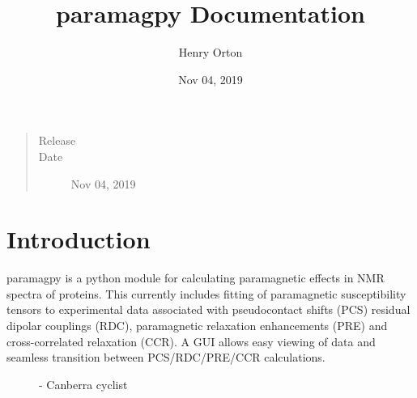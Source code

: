 \documentclass[a4paper,10pt,english,openany,oneside]{sphinxmanual}
\title{paramagpy Documentation}
\date{Nov 04, 2019}
\author{Henry Orton}
\begin{document}
\pagestyle{empty}
\maketitle
\pagestyle{plain}
\sphinxtableofcontents
\pagestyle{normal}
\label{\detokenize{index::doc}}

\begin{quote}\begin{description}
\item[{Release}] 

\item[{Date}] \leavevmode
Nov 04, 2019

\end{description}\end{quote}


\chapter{Introduction}
\label{\detokenize{index:introduction}}
paramagpy is a python module for calculating paramagnetic effects in NMR spectra of proteins. This currently includes fitting of paramagnetic susceptibility tensors to experimental data associated with pseudocontact shifts (PCS) residual dipolar couplings (RDC), paramagnetic relaxation enhancements (PRE) and cross-correlated relaxation (CCR). A GUI allows easy viewing of data and seamless transition between PCS/RDC/PRE/CCR calculations.

\begin{figure}[htbp]
\centering
\capstart

\noindent{}
\caption{ - Canberra cyclist}\label{\detokenize{index:id1}}\end{figure}
\end{document}
